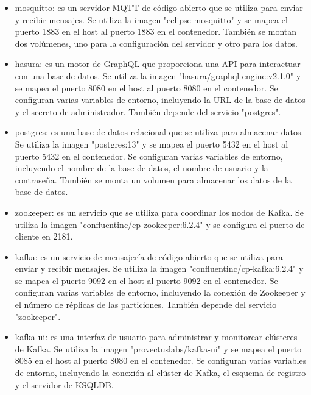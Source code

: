 \begin{itemize}

  \item mosquitto: es un servidor MQTT de código abierto que se utiliza para enviar y recibir mensajes. Se utiliza la imagen "eclipse-mosquitto" y se mapea el puerto 1883 en el host al puerto 1883 en el contenedor. También se montan dos volúmenes, uno para la configuración del servidor y otro para los datos.

  \item hasura: es un motor de GraphQL que proporciona una API para interactuar con una base de datos. Se utiliza la imagen "hasura/graphql-engine:v2.1.0" y se mapea el puerto 8080 en el host al puerto 8080 en el contenedor. Se configuran varias variables de entorno, incluyendo la URL de la base de datos y el secreto de administrador. También depende del servicio "postgres".

  \item postgres: es una base de datos relacional que se utiliza para almacenar datos. Se utiliza la imagen "postgres:13" y se mapea el puerto 5432 en el host al puerto 5432 en el contenedor. Se configuran varias variables de entorno, incluyendo el nombre de la base de datos, el nombre de usuario y la contraseña. También se monta un volumen para almacenar los datos de la base de datos.

  \item zookeeper: es un servicio que se utiliza para coordinar los nodos de Kafka. Se utiliza la imagen "confluentinc/cp-zookeeper:6.2.4" y se configura el puerto de cliente en 2181.

  \item kafka: es un servicio de mensajería de código abierto que se utiliza para enviar y recibir mensajes. Se utiliza la imagen "confluentinc/cp-kafka:6.2.4" y se mapea el puerto 9092 en el host al puerto 9092 en el contenedor. Se configuran varias variables de entorno, incluyendo la conexión de Zookeeper y el número de réplicas de las particiones. También depende del servicio "zookeeper".

  \item kafka-ui: es una interfaz de usuario para administrar y monitorear clústeres de Kafka. Se utiliza la imagen "provectuslabs/kafka-ui" y se mapea el puerto 8085 en el host al puerto 8080 en el contenedor. Se configuran varias variables de entorno, incluyendo la conexión al clúster de Kafka, el esquema de registro y el servidor de KSQLDB.

\end{itemize}


